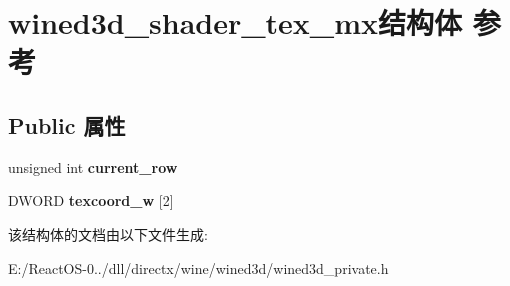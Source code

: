 \hypertarget{structwined3d__shader__tex__mx}{}\section{wined3d\+\_\+shader\+\_\+tex\+\_\+mx结构体 参考}
\label{structwined3d__shader__tex__mx}
\subsection*{Public 属性}
\begin{DoxyCompactItemize}
\item 
\mbox{\label{structwined3d__shader__tex__mx_a5f432582a2b5c6722656d5f7f738798a}} 
unsigned int {\bfseries current\+\_\+row}
\item 
\mbox{\label{structwined3d__shader__tex__mx_aa63e0bf92ed341eed10f49a350693105}} 
D\+W\+O\+RD {\bfseries texcoord\+\_\+w} \mbox{[}2\mbox{]}
\end{DoxyCompactItemize}


该结构体的文档由以下文件生成\+:\begin{DoxyCompactItemize}
\item 
E\+:/\+React\+O\+S-\/0../dll/directx/wine/wined3d/wined3d\+\_\+private.\+h\end{DoxyCompactItemize}
